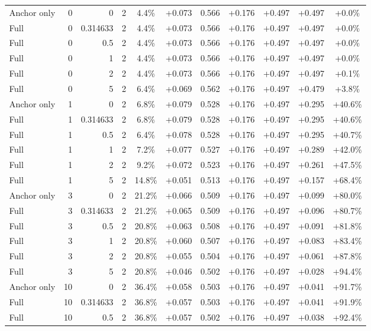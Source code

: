 \begin{table}[htbp]
\begin{tabular}{lrrrccccccc}
Anchor only & 0 & 0 & 2 & 4.4\% & +0.073 & 0.566 & +0.176 & +0.497 & +0.497 & +0.0\% \\
Full & 0 & 0.314633 & 2 & 4.4\% & +0.073 & 0.566 & +0.176 & +0.497 & +0.497 & +0.0\% \\
Full & 0 & 0.5 & 2 & 4.4\% & +0.073 & 0.566 & +0.176 & +0.497 & +0.497 & +0.0\% \\
Full & 0 & 1 & 2 & 4.4\% & +0.073 & 0.566 & +0.176 & +0.497 & +0.497 & +0.0\% \\
Full & 0 & 2 & 2 & 4.4\% & +0.073 & 0.566 & +0.176 & +0.497 & +0.497 & +0.1\% \\
Full & 0 & 5 & 2 & 6.4\% & +0.069 & 0.562 & +0.176 & +0.497 & +0.479 & +3.8\% \\
Anchor only & 1 & 0 & 2 & 6.8\% & +0.079 & 0.528 & +0.176 & +0.497 & +0.295 & +40.6\% \\
Full & 1 & 0.314633 & 2 & 6.8\% & +0.079 & 0.528 & +0.176 & +0.497 & +0.295 & +40.6\% \\
Full & 1 & 0.5 & 2 & 6.4\% & +0.078 & 0.528 & +0.176 & +0.497 & +0.295 & +40.7\% \\
Full & 1 & 1 & 2 & 7.2\% & +0.077 & 0.527 & +0.176 & +0.497 & +0.289 & +42.0\% \\
Full & 1 & 2 & 2 & 9.2\% & +0.072 & 0.523 & +0.176 & +0.497 & +0.261 & +47.5\% \\
Full & 1 & 5 & 2 & 14.8\% & +0.051 & 0.513 & +0.176 & +0.497 & +0.157 & +68.4\% \\
Anchor only & 3 & 0 & 2 & 21.2\% & +0.066 & 0.509 & +0.176 & +0.497 & +0.099 & +80.0\% \\
Full & 3 & 0.314633 & 2 & 21.2\% & +0.065 & 0.509 & +0.176 & +0.497 & +0.096 & +80.7\% \\
Full & 3 & 0.5 & 2 & 20.8\% & +0.063 & 0.508 & +0.176 & +0.497 & +0.091 & +81.8\% \\
Full & 3 & 1 & 2 & 20.8\% & +0.060 & 0.507 & +0.176 & +0.497 & +0.083 & +83.4\% \\
Full & 3 & 2 & 2 & 20.8\% & +0.055 & 0.504 & +0.176 & +0.497 & +0.061 & +87.8\% \\
Full & 3 & 5 & 2 & 20.8\% & +0.046 & 0.502 & +0.176 & +0.497 & +0.028 & +94.4\% \\
Anchor only & 10 & 0 & 2 & 36.4\% & +0.058 & 0.503 & +0.176 & +0.497 & +0.041 & +91.7\% \\
Full & 10 & 0.314633 & 2 & 36.8\% & +0.057 & 0.503 & +0.176 & +0.497 & +0.041 & +91.9\% \\
Full & 10 & 0.5 & 2 & 36.8\% & +0.057 & 0.502 & +0.176 & +0.497 & +0.038 & +92.4\% \\

\end{tabular}
\end{table}
